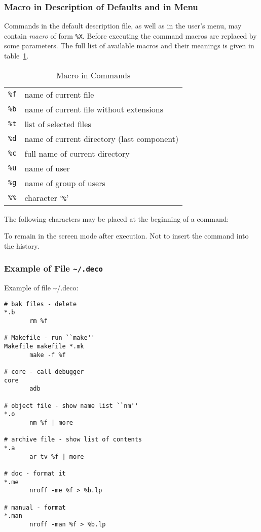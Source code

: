\subsubsection{Macro in Description of Defaults and in Menu}

Commands in the default description file, as well as in the user's menu, may
contain {\em macro} of form {\tt \%X}. Before executing the command
macros are replaced by some parameters. The full list of available macros
and their meanings is given in table~\ref{macro}.

\begin{table}[bp]
\begin{center}
\begin{tabular}{|cl|}
\hline
{\tt \%f} & name of current file \\
{\tt \%b} & name of current file without extensions \\
{\tt \%t} & list of selected files \\
{\tt \%d} & name of current directory (last component) \\
{\tt \%c} & full name of current directory \\
{\tt \%u} & name of user \\
{\tt \%g} & name of group of users \\
{\tt \%\%} & character `{\tt \%}' \\
\hline
\end{tabular}
\caption{Macro in Commands}
\label{macro}
\end{center}
\end{table}

The following characters may be placed at the beginning of a command:

\begin{example}
\litem{{\tt -}}
To remain in the screen mode after execution.
Not to insert the command into the history.
\end{example}

\subsubsection{Example of File {\tt \~{}/.deco}}

Example of file \~{}/.deco:
\begin{source}
\begin{verbatim}
# bak files - delete
*.b
       rm %f

# Makefile - run ``make''
Makefile makefile *.mk
       make -f %f

# core - call debugger
core
       adb

# object file - show name list ``nm''
*.o
       nm %f | more

# archive file - show list of contents
*.a
       ar tv %f | more

# doc - format it
*.me
       nroff -me %f > %b.lp

# manual - format
*.man
       nroff -man %f > %b.lp
\end{verbatim}
\end{source}

